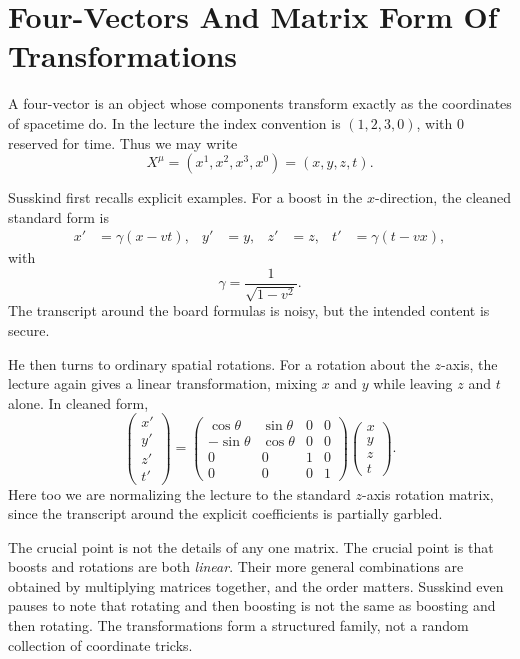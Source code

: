 \section{Four-Vectors And Matrix Form Of Transformations}

A four-vector is an object whose components transform exactly as the coordinates of spacetime do. In the lecture the index convention is \((1,2,3,0)\), with \(0\) reserved for time. Thus we may write
\[
X^\mu=(x^1,x^2,x^3,x^0)=(x,y,z,t).
\]

Susskind first recalls explicit examples. For a boost in the \(x\)-direction, the cleaned standard form is
\begin{align}
x'&=\gamma(x-vt),&
y'&=y,&
z'&=z,&
t'&=\gamma(t-vx),
\end{align}
with
\begin{equation}
\gamma=\frac{1}{\sqrt{1-v^2}}.
\end{equation}
The transcript around the board formulas is noisy, but the intended content is secure.

He then turns to ordinary spatial rotations. For a rotation about the \(z\)-axis, the lecture again gives a linear transformation, mixing \(x\) and \(y\) while leaving \(z\) and \(t\) alone. In cleaned form,
\begin{equation}
\begin{pmatrix}
x'\\
y'\\
z'\\
t'
\end{pmatrix}
=
\begin{pmatrix}
\cos\theta & \sin\theta & 0 & 0\\
-\sin\theta & \cos\theta & 0 & 0\\
0 & 0 & 1 & 0\\
0 & 0 & 0 & 1
\end{pmatrix}
\begin{pmatrix}
x\\
y\\
z\\
t
\end{pmatrix}.
\end{equation}
Here too we are normalizing the lecture to the standard \(z\)-axis rotation matrix, since the transcript around the explicit coefficients is partially garbled.

The crucial point is not the details of any one matrix. The crucial point is that boosts and rotations are both \emph{linear}. Their more general combinations are obtained by multiplying matrices together, and the order matters. Susskind even pauses to note that rotating and then boosting is not the same as boosting and then rotating. The transformations form a structured family, not a random collection of coordinate tricks.

